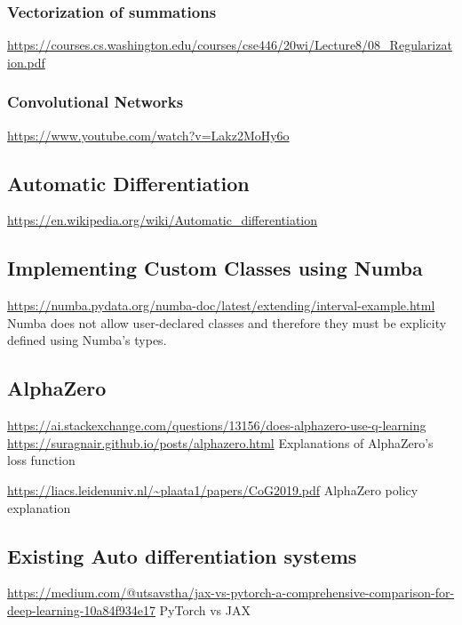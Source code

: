 \documentclass{article}
\begin{document}
    \subsubsection{Vectorization of summations}
    \noindent \url{https://courses.cs.washington.edu/courses/cse446/20wi/Lecture8/08_Regularization.pdf}

    \subsubsection{Convolutional Networks}
    \noindent \url{https://www.youtube.com/watch?v=Lakz2MoHy6o}\\

    \subsection{Automatic Differentiation}
    \noindent \url{https://en.wikipedia.org/wiki/Automatic_differentiation}

    \subsection{Implementing Custom Classes using Numba}
    \noindent \url{https://numba.pydata.org/numba-doc/latest/extending/interval-example.html}
    Numba does not allow user-declared classes and therefore they must be explicity defined using Numba's types.

    \subsection{AlphaZero}
    \noindent \url{https://ai.stackexchange.com/questions/13156/does-alphazero-use-q-learning}
    \noindent \url{https://suragnair.github.io/posts/alphazero.html}
    Explanations of AlphaZero's loss function

    \noindent \url{https://liacs.leidenuniv.nl/~plaata1/papers/CoG2019.pdf}
    AlphaZero policy explanation

    \subsection{Existing Auto differentiation systems}
    \noindent \url{https://medium.com/@utsavstha/jax-vs-pytorch-a-comprehensive-comparison-for-deep-learning-10a84f934e17}
    PyTorch vs JAX
\end{document}
